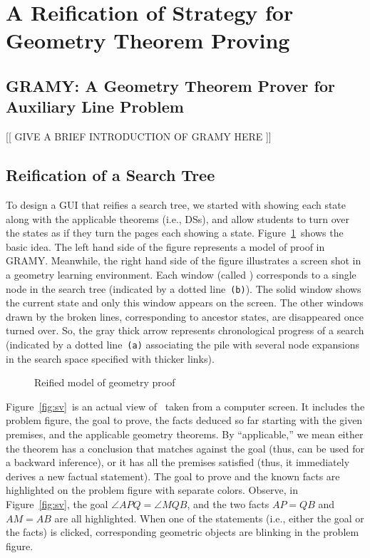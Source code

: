 
\section{A Reification of Strategy for Geometry Theorem Proving}
\label{sec:gw}

\subsection{GRAMY: A Geometry Theorem Prover for Auxiliary Line Problem}

[[ GIVE A BRIEF INTRODUCTION OF GRAMY HERE ]]


\subsection{Reification of a Search Tree}

To design a GUI that reifies a search tree, we started with showing each
state along with the applicable theorems (i.e., DSs), and allow students
to turn over the states as if they turn the pages each showing a state.
Figure~\ref{fig:bi}~shows the basic idea.  The left hand side of the
figure represents a model of proof in GRAMY.  Meanwhile, the right hand
side of the figure illustrates a screen shot in a geometry learning
environment.  Each window (called \StateView) corresponds to a single
node in the search tree (indicated by a dotted line~\texttt{(b)}).  The
solid window shows the current state and only this window appears on the
screen.  The other windows drawn by the broken lines, corresponding to
ancestor states, are disappeared once turned over.  So, the gray thick
arrow represents chronological progress of a search (indicated by a
dotted line~\texttt{(a)} associating the pile with several node
expansions in the search space specified with thicker links).

\begin{figure}[tb]
 \center
 \caption{Reified model of geometry proof}
 \label{fig:bi}
\end{figure}

Figure~\ref{fig:sv}~is an actual view of \StateView\ taken from a
computer screen.  It includes the problem figure, the goal to prove, the
facts deduced so far starting with the given premises, and the
applicable geometry theorems.  By ``applicable,'' we mean either the
theorem has a conclusion that matches against the goal (thus, can be
used for a backward inference), or it has all the premises satisfied
(thus, it immediately derives a new factual statement).  The goal to
prove and the known facts are highlighted on the problem figure with
separate colors.  Observe, in Figure~\ref{fig:sv}, the goal $\angle APQ
= \angle MQB$, and the two facts $AP = QB$ and $AM = AB$ are all
highlighted.  When one of the statements (i.e., either the goal or the
facts) is clicked, corresponding geometric objects are blinking in the
problem figure.

